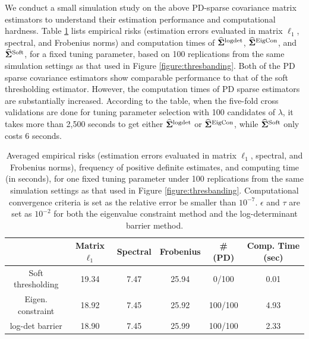 \documentclass[times,sort&compress,3p]{elsarticle}
\begin{document}
We conduct a small simulation study on the above PD-sparse covariance matrix estimators to understand their estimation performance and computational hardness.
 Table  \ref{table:timecomp0} lists empirical risks (estimation errors evaluated in matrix $\ell_1$, spectral, and Frobenius norms) and computation times of $\widehat{\bf \Sigma}^{\rm logdet}$, $\widehat{\bf \Sigma}^{\rm EigCon}$, and $\widehat{\bf \Sigma}^{\rm Soft}$, for a fixed tuning parameter, based on 100 replications from the same simulation settings as that used in  Figure \ref{figure:thresbanding}.
Both of the PD sparse covariance estimators show comparable performance to that of the soft thresholding estimator. %
However, the computation  times of PD sparse estimators
 are substantially increased.
According to the table, when the five-fold cross validations are done for tuning parameter selection with 100 candidates of $\lambda$,
it takes more than 2,500 seconds to get either $\widehat{\bf \Sigma}^{\rm logdet}$ or $\widehat{\bf \Sigma}^{\rm EigCon}$,
while $\widehat{\bf \Sigma}^{\rm Soft}$ only costs 6 seconds.
\begin{table}[h]{
\begin{center}
\begin{tabular}{c|ccccc}
\hline
	  & Matrix $\ell_1$ & Spectral & Frobenius & \#(PD) & Comp. Time (sec)  \\
\hline
Soft thresholding &  19.34  & 7.47   & 25.94  & 0/100 & 0.01  \\
Eigen. constraint  & 18.92  & 7.45  & 25.92  & 100/100 & 4.93 \\
log-det barrier  & 18.90  & 7.45  & 25.99  & 100/100  & 2.33 \\
\hline				
\end{tabular}
\caption{Averaged empirical risks (estimation errors evaluated in matrix $\ell_1$, spectral, and Frobenius norms), frequency of positive definite estimates, and computing time (in seconds), for one fixed tuning parameter under 100 replications from the same simulation settings as that used in  Figure \ref{figure:thresbanding}.
Computational convergence criteria is set as the relative error be smaller than $10^{-7}$.
$\epsilon$ and $\tau$ are set as $10^{-2}$ for both the eigenvalue constraint method and the log-determinant barrier method.}
\label{table:timecomp0}
\end{center}
}
\end{table}
\end{document}
